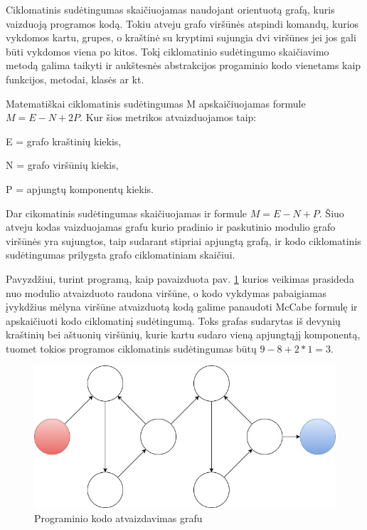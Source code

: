 \documentclass{VUMIFPSbakalaurinis}
\begin{document}
Ciklomatinis sudėtingumas skaičiuojamas naudojant orientuotą grafą, kuris vaizduoją programos kodą. Tokiu atveju grafo viršūnės atspindi komandų, kurios vykdomos kartu, grupes, o kraštinė su kryptimi sujungia dvi viršūnes jei jos gali būti vykdomos viena po kitos. Tokį ciklomatinio sudėtingumo skaičiavimo metodą galima taikyti ir aukštesnės abstrakcijos progaminio kodo vienetams kaip funkcijos, metodai, klasės ar kt.

Matematiškai ciklomatinis sudėtingumas M apskaičiuojamas formule \(M = E - N + 2P\). Kur šios metrikos atvaizduojamos taip:
\begin{description}  
\item E = grafo kraštinių kiekis,
\item N = grafo viršūnių kiekis,
\item P = apjungtų komponentų kiekis.
\end{description} 
Dar cikomatinis sudėtingumas skaičiuojamas ir formule \(M = E - N + P\). Šiuo atveju kodas vaizduojamas grafu kurio pradinio ir paskutinio modulio grafo viršūnės yra sujungtos, taip sudarant stipriai apjungtą grafą, ir kodo ciklomatinis sudėtingumas prilygsta grafo ciklomatiniam skaičiui.

Pavyzdžiui, turint programą, kaip pavaizduota pav. \ref{img:Cyclomatic_graph_1} kurios veikimas prasideda nuo modulio atvaizduoto raudona viršūne, o kodo vykdymas pabaigiamas įvykdžius mėlyna viršūne atvaizduotą kodą galime panaudoti McCabe formulę ir apskaičiuoti kodo ciklomatinį sudėtingumą. Toks grafas sudarytas iš devynių kraštinių bei aštuonių viršūnių, kurie kartu sudaro vieną apjungtąjį komponentą, tuomet tokios programos ciklomatinis sudėtingumas būtų \(9 - 8 + 2 * 1 = 3\).

\begin{figure}[H]
    \centering
    \includegraphics[scale=0.5]{img/Cyclomatic_graph_1}
    \caption{Programinio kodo atvaizdavimas grafu}
    \label{img:Cyclomatic_graph_1}
\end{figure}
\end{document}
